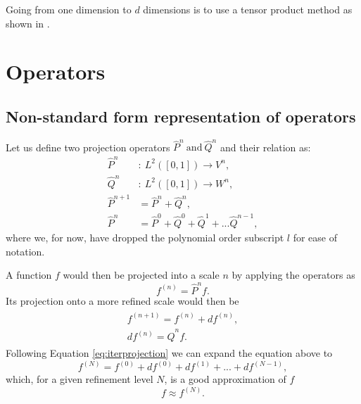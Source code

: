 \documentclass[../Thesis.tex]{subfiles}
\begin{document}
Going from one dimension to $d$ dimensions is to use a tensor product method as shown in
\cite{Frediani:2013}.

\section{Operators}
\subsection{Non-standard form representation of operators}\label{NSformsec}
Let us define two projection operators $\hat{P}^n \ \text{and}\ \hat{Q}^n $  and their relation as:
\begin{align}
  \hat{P}^n &: \ L^2([0, 1]) \to V^n, \\
  \hat{Q}^n &:\  L^2([0, 1]) \to W^n, \\
  \hat{P}^{n+1} &= \hat{P}^n + \hat{Q}^n,\\
  \hat{P}^n &= \hat{P}^0 + \hat{Q}^0 + \hat{Q}^1 + ...  \hat{Q}^{n-1},\label{eq:iterprojection}
\end{align}
where we, for now, have dropped the polynomial order subscript $l$ for ease of
notation.

A function $f$ would then be projected into a scale $n$ by applying the
operators as \cite{Frediani:2013}
\begin{equation}
   f^{(n)} = \hat{P}^n f.
\end{equation}
Its projection onto a more refined scale would then be \cite{Frediani:2013}
\begin{align}\label{eq:refinef}
  \begin{split}
    f^ {(n+1)} = f^{(n)} + df^{(n)},\\
    df^{(n)} = \hat{Q}^nf.
  \end{split}
\end{align}
Following Equation \ref{eq:iterprojection} we can expand the equation above to
\begin{equation}
  f^{(N)} = f^{(0)} + df^{(0)} + df^{(1)} + ... + df^{(N-1)},
\end{equation}
which, for a given refinement level $N$, is a good approximation of $f$
\begin{equation}
  f \approx f^{(N)}.
\end{equation}
\end{document}
